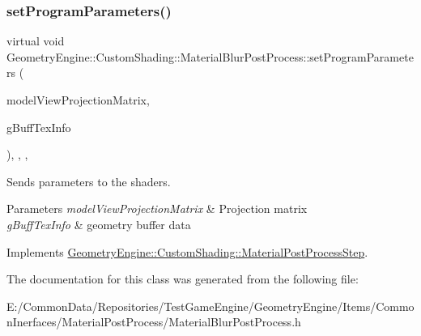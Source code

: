 \subsubsection{\texorpdfstring{setProgramParameters()}{setProgramParameters()}}
{\footnotesize\ttfamily virtual void Geometry\+Engine\+::\+Custom\+Shading\+::\+Material\+Blur\+Post\+Process\+::set\+Program\+Parameters (\begin{DoxyParamCaption}\item[{const Q\+Matrix4x4 \&}]{model\+View\+Projection\+Matrix,  }\item[{const \mbox{\hyperlink{class_geometry_engine_1_1_g_buffer_texture_info}{G\+Buffer\+Texture\+Info}} \&}]{g\+Buff\+Tex\+Info }\end{DoxyParamCaption})\hspace{0.3cm}{\ttfamily [inline]}, {\ttfamily [override]}, {\ttfamily [protected]}, {\ttfamily [virtual]}}

Sends parameters to the shaders. 
\begin{DoxyParams}{Parameters}
{\em model\+View\+Projection\+Matrix} & Projection matrix \\
\hline
{\em g\+Buff\+Tex\+Info} & geometry buffer data \\
\hline
\end{DoxyParams}


Implements \mbox{\hyperlink{class_geometry_engine_1_1_custom_shading_1_1_material_post_process_step_ac4b9fa8b3d4fb80b82a9bd43add77f1e}{Geometry\+Engine\+::\+Custom\+Shading\+::\+Material\+Post\+Process\+Step}}.



The documentation for this class was generated from the following file\+:\begin{DoxyCompactItemize}
\item 
E\+:/\+Common\+Data/\+Repositories/\+Test\+Game\+Engine/\+Geometry\+Engine/\+Items/\+Common\+Inerfaces/\+Material\+Post\+Process/Material\+Blur\+Post\+Process.\+h\end{DoxyCompactItemize}
